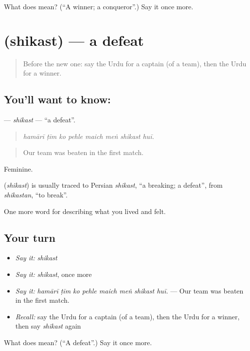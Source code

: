 \begin{tcolorbox}[breakable,colback=teal!4,colframe=teal!35!black,title={Before you move on}]
What does  mean? (\textquotedblleft{}A winner; a conqueror\textquotedblright{}.) Say it once more.
\end{tcolorbox}
\section[\texorpdfstring{\ur{شکست} (shikast)}{شکست (shikast)}]{ (shikast) — a defeat}

\label{lesson:UR-C521-shikast}



\begin{quote}
Before the new one: say the Urdu for a captain (of a team), then the Urdu for a winner.
\end{quote}

\subsection*{You'll want to know: }
\textbf{} — \emph{shikast} — \textquotedblleft{}a defeat\textquotedblright{}.

\begin{quote}
       
\end{quote}

\begin{quote}
\emph{hamārī ṭīm ko pehle maich meṅ shikast huī.}
\end{quote}

\begin{quote}
Our team was beaten in the first match.
\end{quote}

Feminine.

\begin{cousinweb}
\textbf{} (\emph{shikast}) is usually traced to Persian \emph{shikast}, \textquotedblleft{}a breaking; a defeat\textquotedblright{}, from \emph{shikastan}, \textquotedblleft{}to break\textquotedblright{}.
\end{cousinweb}

\begin{grammarlens}[title={What you've built}]
One more word for describing what you lived and felt.
\end{grammarlens}

\subsection*{Your turn}
\begin{itemize}
\raggedright
  \item \emph{Say it:} \emph{shikast}
  \item \emph{Say it:} \emph{shikast}, once more
  \item \emph{Say it:} \emph{hamārī ṭīm ko pehle maich meṅ shikast huī.} — Our team was beaten in the first match.
  \item \emph{Recall:} say the Urdu for a captain (of a team), then the Urdu for a winner, then say \emph{shikast} again
\end{itemize}

\begin{tcolorbox}[breakable,colback=teal!4,colframe=teal!35!black,title={Before you move on}]
What does  mean? (\textquotedblleft{}A defeat\textquotedblright{}.) Say it once more.
\end{tcolorbox}
